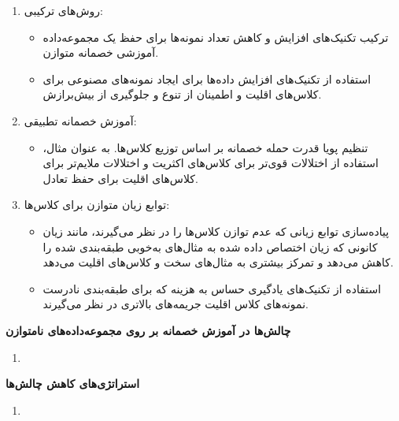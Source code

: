 \begin{qsolve}
\begin{enumerate}
\begin{enumerate}
		
		\item روش‌های ترکیبی:
		\begin{itemize}
			\item 
ترکیب تکنیک‌های افزایش و کاهش تعداد نمونه‌ها برای حفظ یک مجموعه‌داده آموزشی خصمانه متوازن.


			\item 
استفاده از تکنیک‌های افزایش داده‌ها برای ایجاد نمونه‌های مصنوعی برای کلاس‌های اقلیت و اطمینان از تنوع و جلوگیری از بیش‌برازش.
		\end{itemize}
		
		
		
		\item آموزش خصمانه تطبیقی:
		\begin{itemize}
			\item 
تنظیم پویا قدرت حمله خصمانه بر اساس توزیع کلاس‌ها. به عنوان مثال، استفاده از اختلالات قوی‌تر برای کلاس‌های اکثریت و اختلالات ملایم‌تر برای کلاس‌های اقلیت برای حفظ تعادل.
		\end{itemize}
		
		
		
		
		\item توابع زیان متوازن برای کلاس‌ها:
		\begin{itemize}
			\item 
پیاده‌سازی توابع زیانی که عدم توازن کلاس‌ها را در نظر می‌گیرند، مانند زیان کانونی که زیان اختصاص داده شده به مثال‌های به‌خوبی طبقه‌بندی شده را کاهش می‌دهد و تمرکز بیشتری به مثال‌های سخت و کلاس‌های اقلیت می‌دهد.


			\item 
استفاده از تکنیک‌های یادگیری حساس به هزینه که برای طبقه‌بندی نادرست نمونه‌های کلاس اقلیت جریمه‌های بالاتری در نظر می‌گیرند.
		\end{itemize}
	\end{enumerate}
\end{enumerate}
	
\end{qsolve}





\begin{qsolve}
	\item \textbf{چالش‌ها در آموزش خصمانه بر روی مجموعه‌داده‌های نامتوازن}
	\begin{enumerate}
		\item 
	\end{enumerate}
	
	
	
	\item \textbf{استراتژی‌های کاهش چالش‌ها}
	\begin{enumerate}
		\item 
	\end{enumerate}
\end{qsolve}
